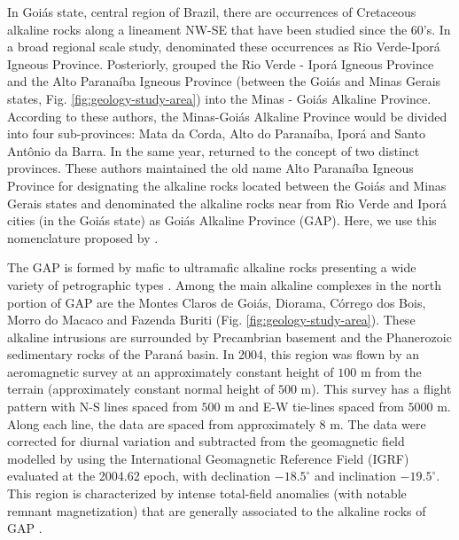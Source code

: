 \documentclass[journal abbreviation, npg]{copernicus}
\begin{document}
In Goiás state, central region of Brazil, there are occurrences of Cretaceous alkaline rocks along a lineament NW-SE that have been studied since the 60's. In a broad regional scale study, \citet{almeida1983} denominated these occurrences as Rio Verde-Iporá Igneous Province. Posteriorly, \citet{sgarbi2002} grouped the Rio Verde - Iporá Igneous Province and the Alto Paranaíba Igneous Province (between the Goiás and Minas Gerais states, Fig. \ref{fig:geology-study-area}) into the Minas - Goiás Alkaline Province. According to these authors, the Minas-Goiás Alkaline Province would be divided into four sub-provinces: Mata da Corda, Alto do Paranaíba, Iporá and Santo Antônio da Barra. In the same year, \citet{junqueira-brod2002} returned to the concept of two distinct provinces. These authors maintained the old name Alto Paranaíba Igneous Province for designating the alkaline rocks located between the Goiás and Minas Gerais states and denominated the alkaline rocks near from Rio Verde and Iporá cities (in the Goiás state) as Goiás Alkaline Province (GAP). Here, we use this nomenclature proposed by \citet{junqueira-brod2002}.

The GAP is formed by mafic to ultramafic alkaline rocks presenting a wide variety of petrographic types \citep{almeida1983, junqueira-brod2005, carlson-etal2007, marangoni-mantovani2013}. Among the main alkaline complexes in the north portion of GAP are the Montes Claros de Goiás, Diorama, Córrego dos Bois, Morro do Macaco and Fazenda Buriti (Fig. \ref{fig:geology-study-area}). These alkaline intrusions are surrounded by Precambrian basement and the Phanerozoic sedimentary rocks of the Paraná basin. In 2004, this region was flown by an aeromagnetic survey at an approximately constant height of $100$ m from the terrain (approximately constant normal height of $500$ m). This survey has a flight pattern with N-S lines spaced from $500$ m and E-W tie-lines spaced from $5000$ m. Along each line, the data are spaced from approximately $8$ m. The data were corrected for diurnal variation and subtracted from the geomagnetic field modelled by using the International Geomagnetic Reference Field (IGRF) evaluated at the 2004.62 epoch, with declination $-18.5^{\circ}$ and inclination $-19.5^{\circ}$. This region is characterized by intense total-field anomalies (with notable remnant magnetization) that are generally associated to the alkaline rocks of GAP \citep{dutra-marangoni2009, dutra-etal2012, marangoni-mantovani2013}.
\end{document}
